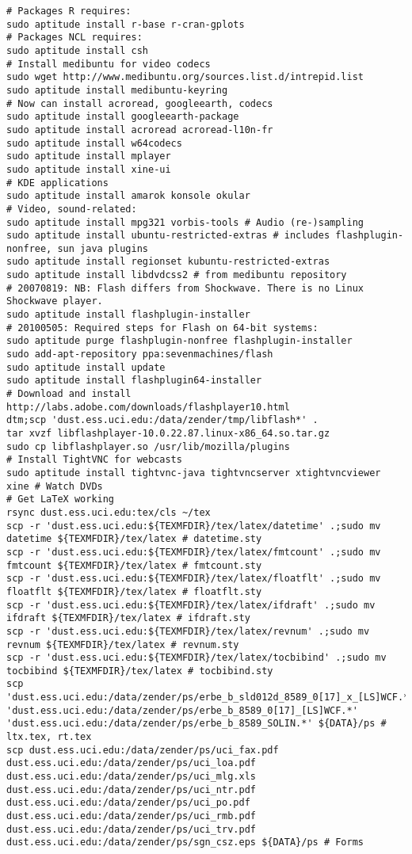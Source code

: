 \documentclass[12pt,twoside]{article}
\begin{document}
\begin{verbatim}
# Packages R requires:
sudo aptitude install r-base r-cran-gplots
# Packages NCL requires:
sudo aptitude install csh
# Install medibuntu for video codecs
sudo wget http://www.medibuntu.org/sources.list.d/intrepid.list
sudo aptitude install medibuntu-keyring
# Now can install acroread, googleearth, codecs
sudo aptitude install googleearth-package
sudo aptitude install acroread acroread-l10n-fr
sudo aptitude install w64codecs
sudo aptitude install mplayer
sudo aptitude install xine-ui
# KDE applications
sudo aptitude install amarok konsole okular
# Video, sound-related: 
sudo aptitude install mpg321 vorbis-tools # Audio (re-)sampling
sudo aptitude install ubuntu-restricted-extras # includes flashplugin-nonfree, sun java plugins
sudo aptitude install regionset kubuntu-restricted-extras
sudo aptitude install libdvdcss2 # from medibuntu repository
# 20070819: NB: Flash differs from Shockwave. There is no Linux Shockwave player.
sudo aptitude install flashplugin-installer
# 20100505: Required steps for Flash on 64-bit systems:
sudo aptitude purge flashplugin-nonfree flashplugin-installer
sudo add-apt-repository ppa:sevenmachines/flash
sudo aptitude install update
sudo aptitude install flashplugin64-installer
# Download and install http://labs.adobe.com/downloads/flashplayer10.html
dtm;scp 'dust.ess.uci.edu:/data/zender/tmp/libflash*' .
tar xvzf libflashplayer-10.0.22.87.linux-x86_64.so.tar.gz
sudo cp libflashplayer.so /usr/lib/mozilla/plugins
# Install TightVNC for webcasts
sudo aptitude install tightvnc-java tightvncserver xtightvncviewer
xine # Watch DVDs
# Get LaTeX working
rsync dust.ess.uci.edu:tex/cls ~/tex
scp -r 'dust.ess.uci.edu:${TEXMFDIR}/tex/latex/datetime' .;sudo mv datetime ${TEXMFDIR}/tex/latex # datetime.sty
scp -r 'dust.ess.uci.edu:${TEXMFDIR}/tex/latex/fmtcount' .;sudo mv fmtcount ${TEXMFDIR}/tex/latex # fmtcount.sty
scp -r 'dust.ess.uci.edu:${TEXMFDIR}/tex/latex/floatflt' .;sudo mv floatflt ${TEXMFDIR}/tex/latex # floatflt.sty
scp -r 'dust.ess.uci.edu:${TEXMFDIR}/tex/latex/ifdraft' .;sudo mv ifdraft ${TEXMFDIR}/tex/latex # ifdraft.sty
scp -r 'dust.ess.uci.edu:${TEXMFDIR}/tex/latex/revnum' .;sudo mv revnum ${TEXMFDIR}/tex/latex # revnum.sty
scp -r 'dust.ess.uci.edu:${TEXMFDIR}/tex/latex/tocbibind' .;sudo mv tocbibind ${TEXMFDIR}/tex/latex # tocbibind.sty
scp 'dust.ess.uci.edu:/data/zender/ps/erbe_b_sld012d_8589_0[17]_x_[LS]WCF.*' 'dust.ess.uci.edu:/data/zender/ps/erbe_b_8589_0[17]_[LS]WCF.*' 'dust.ess.uci.edu:/data/zender/ps/erbe_b_8589_SOLIN.*' ${DATA}/ps # ltx.tex, rt.tex
scp dust.ess.uci.edu:/data/zender/ps/uci_fax.pdf dust.ess.uci.edu:/data/zender/ps/uci_loa.pdf dust.ess.uci.edu:/data/zender/ps/uci_mlg.xls dust.ess.uci.edu:/data/zender/ps/uci_ntr.pdf dust.ess.uci.edu:/data/zender/ps/uci_po.pdf dust.ess.uci.edu:/data/zender/ps/uci_rmb.pdf dust.ess.uci.edu:/data/zender/ps/uci_trv.pdf dust.ess.uci.edu:/data/zender/ps/sgn_csz.eps ${DATA}/ps # Forms

\end{verbatim}
\end{document}
